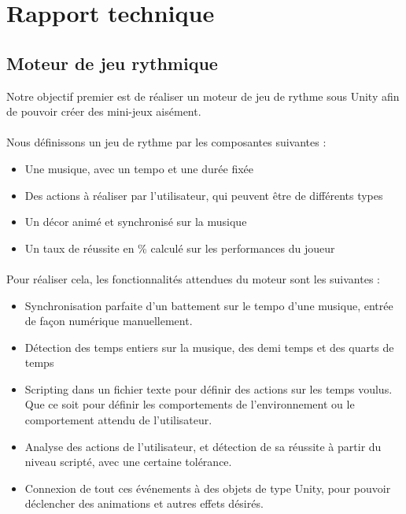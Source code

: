\section{Rapport technique}


\subsection{Moteur de jeu rythmique}

Notre objectif premier est de réaliser un moteur de jeu de rythme sous Unity afin de pouvoir créer des mini-jeux aisément.

\paragraph{}

Nous définissons un jeu de rythme par les composantes suivantes :
\begin{itemize}
\item Une musique, avec un tempo et une durée fixée
\item Des actions à réaliser par l'utilisateur, qui peuvent être de différents types
\item Un décor animé et synchronisé sur la musique
\item Un taux de réussite en \% calculé sur les performances du joueur
\end{itemize}

\paragraph{}

Pour réaliser cela, les fonctionnalités attendues du moteur sont les suivantes :
\begin{itemize}
\item Synchronisation parfaite d'un battement sur le tempo d'une musique, entrée de façon numérique manuellement.
\item Détection des temps entiers sur la musique, des demi temps et des quarts de temps
\item Scripting dans un fichier texte pour définir des actions sur les temps voulus. Que ce soit pour définir les comportements de l'environnement ou le comportement attendu de l'utilisateur.
\item Analyse des actions de l'utilisateur, et détection de sa réussite à partir du niveau scripté, avec une certaine tolérance.
\item Connexion de tout ces événements à des objets de type Unity, pour pouvoir déclencher des animations et autres effets désirés.
\end{itemize}


